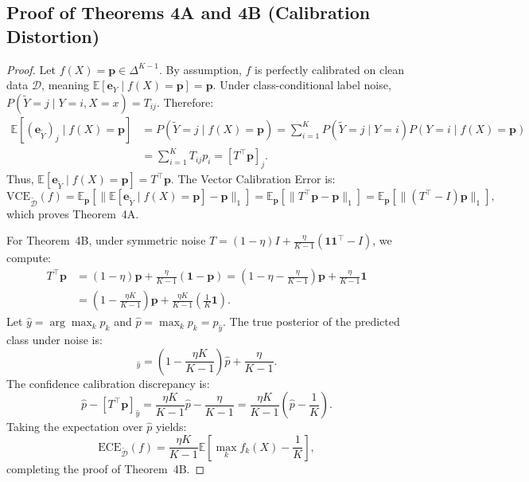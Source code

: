 \documentclass[10pt,twocolumn]{article}
\theoremstyle{definition}
\begin{document}
\subsection{Proof of Theorems 4A and 4B (Calibration Distortion)}
\begin{proof}
Let $f(X) = \mathbf{p} \in \Delta^{K-1}$. By assumption, $f$ is perfectly calibrated on clean data $\mathcal{D}$, meaning $\mathbb{E}[\mathbf{e}_Y \mid f(X) = \mathbf{p}] = \mathbf{p}$. Under class-conditional label noise, $P(\tilde{Y} = j \mid Y = i, X = x) = T_{ij}$. Therefore:
\begin{align}
\mathbb{E}[(\mathbf{e}_{\tilde{Y}})_j \mid f(X) = \mathbf{p}] &= P(\tilde{Y} = j \mid f(X) = \mathbf{p}) = \sum_{i=1}^K P(\tilde{Y} = j \mid Y = i) P(Y = i \mid f(X) = \mathbf{p}) \\
&= \sum_{i=1}^K T_{ij} p_i = [T^\top \mathbf{p}]_j.
\end{align}
Thus, $\mathbb{E}[\mathbf{e}_{\tilde{Y}} \mid f(X) = \mathbf{p}] = T^\top \mathbf{p}$. The Vector Calibration Error is:
\begin{equation}
\text{VCE}_{\tilde{\mathcal{D}}}(f) = \mathbb{E}_{\mathbf{p}} \left[ \| \mathbb{E}[\mathbf{e}_{\tilde{Y}} \mid f(X) = \mathbf{p}] - \mathbf{p} \|_1 \right] = \mathbb{E}_{\mathbf{p}} \left[ \| T^\top \mathbf{p} - \mathbf{p} \|_1 \right] = \mathbb{E}_{\mathbf{p}} \left[ \| (T^\top - I) \mathbf{p} \|_1 \right],
\end{equation}
which proves Theorem~4A.

For Theorem~4B, under symmetric noise $T = (1 - \eta) I + \frac{\eta}{K-1} (\mathbf{1}\mathbf{1}^\top - I)$, we compute:
\begin{align}
T^\top \mathbf{p} &= (1 - \eta) \mathbf{p} + \frac{\eta}{K-1} (\mathbf{1} - \mathbf{p}) = \left( 1 - \eta - \frac{\eta}{K-1} \right) \mathbf{p} + \frac{\eta}{K-1} \mathbf{1} \\
&= \left( 1 - \frac{\eta K}{K-1} \right) \mathbf{p} + \frac{\eta K}{K-1} \left( \frac{1}{K} \mathbf{1} \right).
\end{align}
Let $\hat{y} = \arg\max_k p_k$ and $\hat{p} = \max_k p_k = p_{\hat{y}}$. The true posterior of the predicted class under noise is:
\begin{equation}
[T^\top \mathbf{p}]_{\hat{y}} = \left( 1 - \frac{\eta K}{K-1} \right) \hat{p} + \frac{\eta}{K-1}.
\end{equation}
The confidence calibration discrepancy is:
\begin{equation}
\hat{p} - [T^\top \mathbf{p}]_{\hat{y}} = \frac{\eta K}{K-1} \hat{p} - \frac{\eta}{K-1} = \frac{\eta K}{K-1} \left( \hat{p} - \frac{1}{K} \right).
\end{equation}
Taking the expectation over $\hat{p}$ yields:
\begin{equation}
\text{ECE}_{\tilde{\mathcal{D}}}(f) = \frac{\eta K}{K-1} \mathbb{E} \left[ \max_k f_k(X) - \frac{1}{K} \right],
\end{equation}
completing the proof of Theorem~4B.
\end{proof}
\end{document}
